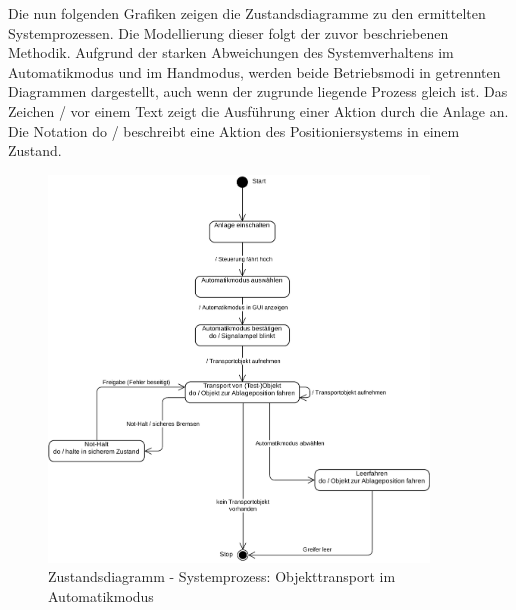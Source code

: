 \documentclass[../../../Bachelorarbeit.tex]{subfiles}
\begin{document}
Die nun folgenden Grafiken zeigen die Zustandsdiagramme zu den ermittelten Systemprozessen. Die Modellierung dieser folgt der zuvor beschriebenen Methodik. Aufgrund der starken Abweichungen des Systemverhaltens im Automatikmodus und im Handmodus, werden beide Betriebsmodi in getrennten Diagrammen dargestellt, auch wenn der zugrunde liegende Prozess gleich ist. Das Zeichen \glqq /\grqq{} vor einem Text zeigt die Ausführung einer Aktion durch die Anlage an. Die Notation \glqq do /\grqq{} beschreibt eine Aktion des Positioniersystems in einem Zustand.

\begin{figure}[H]
    \centering
    \includegraphics[width=0.9\textwidth]{Images/auto_zustand.pdf}
    \caption[Zustandsdiagramm Automatikmodus]{Zustandsdiagramm - Systemprozess: Objekttransport im Automatikmodus}
    \label{fig:my-img4}
\end{figure}
\end{document}
